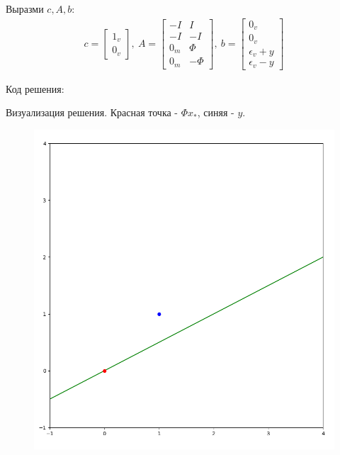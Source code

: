 \documentclass{article}
\begin{document}
    Выразми $c, A, b$:
    \begin{align*}
        c = \left[\begin{matrix} 1_v\\ 0_v \end{matrix} \right], \:
        A = \left[
            \begin{matrix}
                -I & I\\
                -I & -I \\
                0_m & \Phi \\
                0_m & -\Phi
            \end{matrix}
            \right], \:
        b = \left[
            \begin{matrix}
                0_v \\
                0_v\\
                \epsilon_v + y\\
                \epsilon_v - y
            \end{matrix}
            \right]
    \end{align*}
    
    \newpage
    Код решения:
    
    
    Визуализация решения. Красная точка - $\Phi x_*$, синяя - $y$.
    \begin{figure}[H]
        \includegraphics[width=0.8\linewidth]{Screenshots/task7_4.png}
    \end{figure}
    \bigbreak
    
\end{document}
